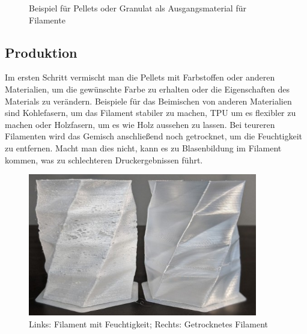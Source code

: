 \documentclass[10pt]{article}
\begin{document}
    \begin{figure}[H]
        \centering
        \qquad
        \caption*{Beispiel für Pellets oder Granulat als Ausgangsmaterial für Filamente}
    \end{figure}

    \subsection{Produktion}
    Im ersten Schritt vermischt man die Pellets mit Farbstoffen oder anderen Materialien, um die gewünschte Farbe zu erhalten oder die Eigenschaften des Materials zu verändern.
    Beispiele für das Beimischen von anderen Materialien sind Kohlefasern, um das Filament stabiler zu machen, TPU um es flexibler zu machen oder Holzfasern, um es wie Holz aussehen zu lassen.
    Bei teureren Filamenten wird das Gemisch anschließend noch getrocknet, um die Feuchtigkeit zu entfernen.
    Macht man dies nicht, kann es zu Blasenbildung im Filament kommen, was zu schlechteren Druckergebnissen führt.

    \begin{figure}[H]
        \centering
        \includegraphics[width=10cm]{img/wet_filament}
        \caption*{Links: Filament mit Feuchtigkeit; Rechts: Getrocknetes Filament}
    \end{figure}
\end{document}
